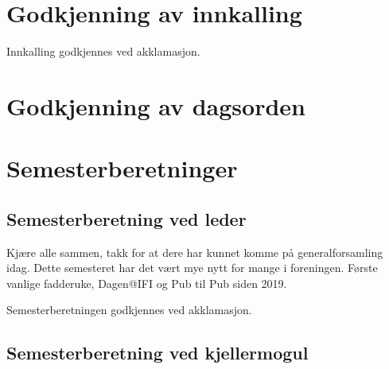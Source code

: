 \documentclass[10pt,norsk,a4paper,usenames,dvipsnames]{article}
\begin{document}
\section{Godkjenning av innkalling}
Innkalling godkjennes ved akklamasjon.


\section{Godkjenning av dagsorden}

\section{Semesterberetninger}
    \subsection{Semesterberetning ved leder}

        \begin{multicols}{2}

        Kjære alle sammen, takk for at dere har kunnet komme på generalforsamling idag. Dette semesteret har det vært mye nytt for mange i foreningen. Første vanlige fadderuke, Dagen@IFI og Pub til Pub siden 2019.

        \end{multicols}

        Semesterberetningen godkjennes ved akklamasjon.


    \subsection{Semesterberetning ved kjellermogul}
\end{document}
